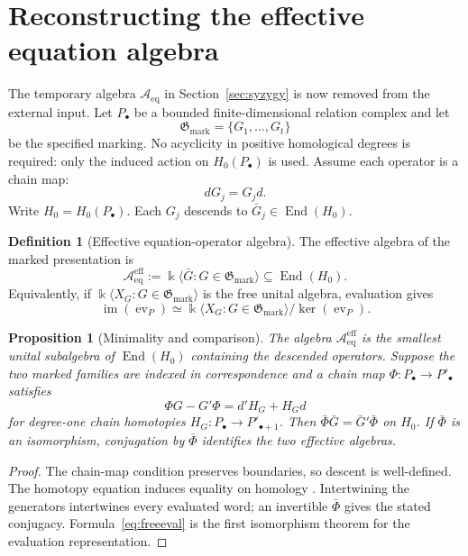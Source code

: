 \documentclass[11pt]{amsart}
\newtheorem{proposition}[theorem]{Proposition}
\theoremstyle{definition}
\newtheorem{definition}[theorem]{Definition}
\newcommand{\kk}{\Bbbk}
\newcommand{\im}{\operatorname{im}}
\newcommand{\End}{\operatorname{End}}
\newcommand{\Aeff}{\mathscr A_{\mathrm{eq}}^{\mathrm{eff}}}
\newcommand{\Aeq}{\mathscr A_{\mathrm{eq}}}
\newcommand{\Gmark}{\mathfrak G_{\mathrm{mark}}}
\begin{document}
\section{Reconstructing the effective equation algebra}

The temporary algebra $\Aeq$ in Section~\ref{sec:syzygy} is now removed
from the external input. Let $P_\bullet$ be a bounded finite-dimensional
relation complex and let
\[
\Gmark=\{G_1,\ldots,G_t\}
\]
be the specified marking. No acyclicity in positive homological degrees
is required: only the induced action on $H_0(P_\bullet)$ is used.
Assume each operator is a chain map:
\[
dG_j=G_jd.
\]
Write \(H_0=H_0(P_\bullet)\). Each \(G_j\) descends to \(\bar G_j\in\End(H_0)\).

\begin{definition}[Effective equation-operator algebra]
The effective algebra of the marked presentation is
\begin{equation}
\Aeff:=\kk\langle\bar G:G\in\Gmark\rangle
\subseteq\End(H_0).
\label{eq:Aeff}
\end{equation}
Equivalently, if \(\kk\langle X_G:G\in\Gmark\rangle\) is the free unital algebra, evaluation gives
\begin{equation}
\im(\operatorname{ev}_P)
\simeq
\kk\langle X_G:G\in\Gmark\rangle/\ker(\operatorname{ev}_P).
\label{eq:freeeval}
\end{equation}
\end{definition}

\begin{proposition}[Minimality and comparison]\label{prop:algebra-comparison}
The algebra \(\Aeff\) is the smallest unital subalgebra of \(\End(H_0)\) containing
the descended operators. Suppose the two marked families are indexed in correspondence
and a chain map \(\Phi:P_\bullet\to P'_\bullet\) satisfies
\[
\Phi G-G'\Phi=d'H_G+H_Gd
\]
for degree-one chain homotopies \(H_G:P_\bullet\to P'_{\bullet+1}\).
Then \(\bar\Phi\bar G=\bar G'\bar\Phi\) on \(H_0\). If \(\bar\Phi\) is an
isomorphism, conjugation by \(\bar\Phi\) identifies the two effective algebras.
\end{proposition}
\begin{proof}
The chain-map condition preserves boundaries, so descent is well-defined.
The homotopy equation induces equality on homology \cite{StacksHomotopy}.
Intertwining the generators intertwines every evaluated word; an invertible
\(\bar\Phi\) gives the stated conjugacy. Formula~\eqref{eq:freeeval} is the
first isomorphism theorem for the evaluation representation.
\end{proof}
\end{document}
